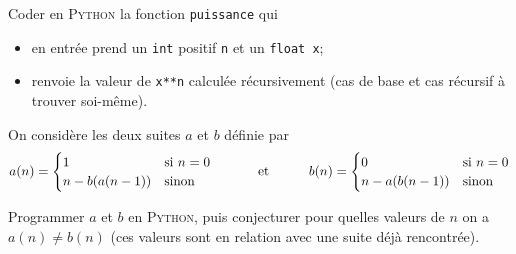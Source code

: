 \documentclass[10pt,firamath,cours]{nsi}
\begin{document}
\begin{exercice}
	Coder en \textsc{Python} la fonction \texttt{puissance} qui
	\begin{itemize}
		\item 	en entrée prend un \texttt{int} positif \texttt{n} et un \texttt{float x};
		\item 	renvoie la valeur de \texttt{x**n} calculée récursivement (cas de base et cas récursif à trouver soi-même).
	\end{itemize}
\end{exercice}


\begin{exercice}
	On considère les deux suites $a$ et $b$ définie par
	$$a(n)=\begin{cases}
			1           & \mbox{si } n=0 \\
			n-b(a(n-1)) & \mbox{sinon}
		\end{cases}
		\mbox{\hspace{3em} et\hspace{3em}}
		b(n)=\begin{cases}
			0           & \mbox{si } n=0 \\
			n-a(b(n-1)) & \mbox{sinon}
		\end{cases}$$
	
	Programmer $a$ et $b$ en \textsc{Python}, puis conjecturer pour quelles valeurs de $n$ on a $a(n)\neq b(n)$ (ces valeurs sont en relation avec une suite déjà rencontrée).
\end{exercice}
\end{document}
